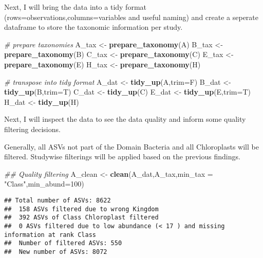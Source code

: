 \documentclass[
]{article}
\newenvironment{Shaded}{\begin{snugshade}}{\end{snugshade}}
\newcommand{\CommentTok}[1]{\textcolor[rgb]{0.56,0.35,0.01}{\textit{#1}}}
\newcommand{\DataTypeTok}[1]{\textcolor[rgb]{0.13,0.29,0.53}{#1}}
\newcommand{\DecValTok}[1]{\textcolor[rgb]{0.00,0.00,0.81}{#1}}
\newcommand{\KeywordTok}[1]{\textcolor[rgb]{0.13,0.29,0.53}{\textbf{#1}}}
\newcommand{\NormalTok}[1]{#1}
\newcommand{\StringTok}[1]{\textcolor[rgb]{0.31,0.60,0.02}{#1}}
\begin{document}
Next, I will bring the data into a tidy format
(rows=observations,columns=variables and useful naming) and create a
seperate dataframe to store the taxonomic information per study.

\begin{Shaded}
\begin{Highlighting}[]
\CommentTok{# prepare taxonomies }
\NormalTok{A_tax <-}\StringTok{ }\KeywordTok{prepare_taxonomy}\NormalTok{(A)}
\NormalTok{B_tax <-}\StringTok{ }\KeywordTok{prepare_taxonomy}\NormalTok{(B)}
\NormalTok{C_tax <-}\StringTok{ }\KeywordTok{prepare_taxonomy}\NormalTok{(C)}
\NormalTok{E_tax <-}\StringTok{ }\KeywordTok{prepare_taxonomy}\NormalTok{(E)}
\NormalTok{H_tax <-}\StringTok{ }\KeywordTok{prepare_taxonomy}\NormalTok{(H)}

\CommentTok{# transpose into tidy format}
\NormalTok{A_dat <-}\StringTok{ }\KeywordTok{tidy_up}\NormalTok{(A,}\DataTypeTok{trim=}\NormalTok{F)}
\NormalTok{B_dat <-}\StringTok{ }\KeywordTok{tidy_up}\NormalTok{(B,}\DataTypeTok{trim=}\NormalTok{T)}
\NormalTok{C_dat <-}\StringTok{ }\KeywordTok{tidy_up}\NormalTok{(C)}
\NormalTok{E_dat <-}\StringTok{ }\KeywordTok{tidy_up}\NormalTok{(E,}\DataTypeTok{trim=}\NormalTok{T)}
\NormalTok{H_dat <-}\StringTok{ }\KeywordTok{tidy_up}\NormalTok{(H)}
\end{Highlighting}
\end{Shaded}

Next, I will inspect the data to see the data quality and inform some
quality filtering decisions.

Generally, all ASVs not part of the Domain Bacteria and all Chloroplasts
will be filtered. Studywise filterings will be applied based on the
previous findings.

\begin{Shaded}
\begin{Highlighting}[]
\CommentTok{## Quality filtering}
\NormalTok{A_clean <-}\StringTok{ }\KeywordTok{clean}\NormalTok{(A_dat,A_tax,}\DataTypeTok{min_tax =} \StringTok{"Class"}\NormalTok{,}\DataTypeTok{min_abund=}\DecValTok{100}\NormalTok{)}
\end{Highlighting}
\end{Shaded}

\begin{verbatim}
## Total number of ASVs: 8622 
##  158 ASVs filtered due to wrong Kingdom
##  392 ASVs of Class Chloroplast filtered
##  0 ASVs filtered due to low abundance (< 17 ) and missing information at rank Class 
##  Number of filtered ASVs: 550 
##  New number of ASVs: 8072
\end{verbatim}
\end{document}
